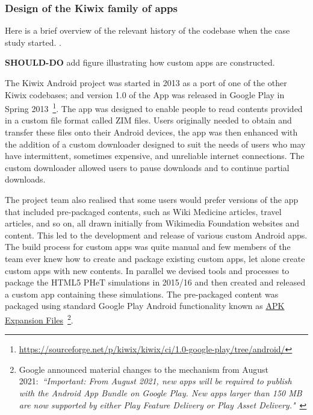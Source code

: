 \subsubsection{Design of the Kiwix family of apps}
Here is a brief overview of the relevant history of the codebase when the case study started. .

\textbf{SHOULD-DO} add figure illustrating how custom apps are constructed.

The Kiwix Android project was started in 2013 as a port of one of the other Kiwix codebases; and version 1.0 of the App was released in Google Play in Spring 2013~\footnote{\url{https://sourceforge.net/p/kiwix/kiwix/ci/1.0-google-play/tree/android/}}. The app was designed to enable people to read contents provided in a custom file format called ZIM files. Users originally needed to obtain and transfer these files onto their Android devices, the app was then enhanced with the addition of a custom downloader designed to suit the needs of users who may have intermittent, sometimes expensive, and unreliable internet connections. The custom downloader allowed users to pause downloads and to continue partial downloads.

The project team also realised that some users would prefer versions of the app that included pre-packaged contents, such as Wiki Medicine articles, travel articles, and so on, all drawn initially from Wikimedia Foundation websites and content. This led to the development and release of various custom Android apps. The build process for custom apps was quite manual and few members of the team ever knew how to create and package existing custom apps, let alone create custom apps with new contents.  In parallel we devised tools and processes to package the HTML5 PHeT simulations in 2015/16 and then created and released a custom app containing these simulations. The pre-packaged content was packaged using standard Google Play Android functionality known as \href{https://developer.android.com/google/play/expansion-files}{APK Expansion Files}~\footnote{Google announced material changes to the mechanism from August 2021:~\emph{``Important: From August 2021, new apps will be required to publish with the Android App Bundle on Google Play. New apps larger than 150 MB are now supported by either Play Feature Delivery or Play Asset Delivery."}~\citep{apk_expansion_files}}. %

